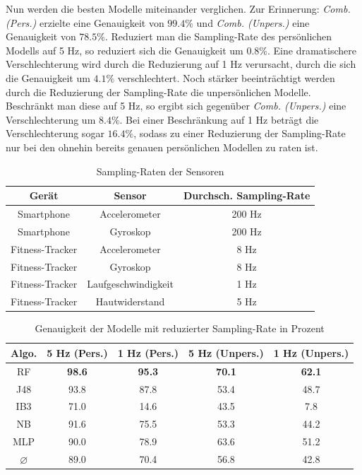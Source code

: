 Nun werden die besten Modelle miteinander verglichen. Zur Erinnerung: \textit{Comb. (Pers.)} erzielte eine Genauigkeit von $99.4 \%$ und \textit{Comb. (Unpers.)} eine Genauigkeit von $78.5 \%$. Reduziert man die Sampling-Rate des persönlichen Modells auf 5 Hz, so reduziert sich die Genauigkeit um $0.8 \%$. Eine dramatischere Verschlechterung wird durch die Reduzierung auf 1 Hz verursacht, durch die sich die Genauigkeit um $4.1 \%$ verschlechtert. Noch stärker beeinträchtigt werden durch die Reduzierung der Sampling-Rate die unpersönlichen Modelle. Beschränkt man diese auf 5 Hz, so ergibt sich gegenüber \textit{Comb. (Unpers.)} eine Verschlechterung um $8.4 \%$. Bei einer Beschränkung auf 1 Hz beträgt die Verschlechterung sogar $16.4 \%$, sodass zu einer Reduzierung der Sampling-Rate nur bei den ohnehin bereits genauen persönlichen Modellen zu raten ist.

\begin{table}
\centering
\begin{tabular}{|c|c|c|}
	\hline 
	\textbf{Gerät} & \textbf{Sensor} & \textbf{Durchsch. Sampling-Rate} \\ 
	\hline 
	Smartphone & Accelerometer & 200 Hz \\ 
	\hline 
	Smartphone & Gyroskop & 200 Hz \\ 
	\hline 
	Fitness-Tracker & Accelerometer & 8 Hz \\ 
	\hline 
	Fitness-Tracker & Gyroskop & 8 Hz \\ 
	\hline 
	Fitness-Tracker & Laufgeschwindigkeit & 1 Hz \\ 
	\hline 
	Fitness-Tracker & Hautwiderstand & 5 Hz \\ 
	\hline 
\end{tabular}
\caption{Sampling-Raten der Sensoren}
\label{tab:sampling-rates}
\end{table}

\begin{table}
\centering
\begin{tabular}{|c|c|c||c|c|}
	\hline 
	\textbf{Algo.} & \textbf{5 Hz (Pers.)} & \textbf{1 Hz (Pers.)} &\textbf{5 Hz (Unpers.)} & \textbf{1 Hz (Unpers.)} \\ 
	\hline 
	RF & \textbf{98.6} & \textbf{95.3} & \textbf{70.1} & \textbf{62.1} \\ 
	J48 & 93.8 & 87.8 & 53.4 & 48.7 \\ 
	IB3 & 71.0 & 14.6 & 43.5 & 7.8 \\ 
	NB & 91.6 & 75.5 & 53.3 & 44.2 \\ 
	MLP & 90.0 & 78.9 & 63.6 & 51.2 \\ 
	\hline 
	$\varnothing$ & 89.0 & 70.4 & 56.8 & 42.8 \\ 
	\hline
\end{tabular} 
\caption{Genauigkeit der Modelle mit reduzierter Sampling-Rate in Prozent}
\label{tab:accuracy-sampling_rate}
\end{table}


